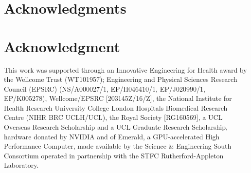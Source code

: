 \documentclass[10pt,journal,compsoc]{IEEEtran}
\begin{document}


\ifCLASSOPTIONcompsoc
  \section*{Acknowledgments}
\else
  \section*{Acknowledgment}
\fi


This work was supported through an Innovative Engineering for Health award by the Wellcome Trust (WT101957); Engineering and Physical Sciences Research Council (EPSRC) (NS/A000027/1, EP/H046410/1, EP/J020990/1, EP/K005278), Wellcome/EPSRC [203145Z/16/Z],  the National Institute for Health Research University College London Hospitals Biomedical Research Centre (NIHR BRC UCLH/UCL), the Royal Society [RG160569], a UCL Overseas Research Scholarship and a UCL Graduate Research Scholarship, hardware donated by NVIDIA and of Emerald, a GPU-accelerated High Performance Computer, made available by the Science \& Engineering South Consortium operated in partnership with the STFC Rutherford-Appleton Laboratory.

\ifCLASSOPTIONcaptionsoff
  \newpage
\fi







%
\end{document}
